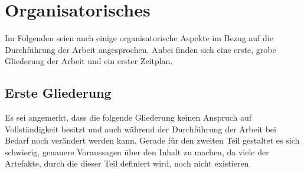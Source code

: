 \section{Organisatorisches}

Im Folgenden seien auch einige organisatorische Aspekte im Bezug auf die Durchführung der Arbeit angesprochen. Anbei finden sich eine erste, grobe Gliederung der Arbeit und ein erster Zeitplan.

\subsection{Erste Gliederung}
Es sei angemerkt, dass die folgende Gliederung keinen Anspruch auf Vollständigkeit besitzt und auch während der Durchführung der Arbeit bei Bedarf noch verändert werden kann.
Gerade für den zweiten Teil gestaltet es sich schwierig, genauere Voraussagen über den Inhalt zu machen, da viele der Artefakte, durch die dieser Teil definiert wird, noch nicht existieren.

